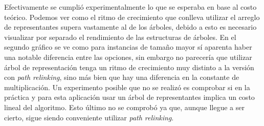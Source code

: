 \indent Efectivamente se cumpli\'o experimentalmente lo que se esperaba en base al costo te\'orico. Podemos ver como el ritmo de crecimiento que conlleva utilizar el arreglo de representantes supera vastamente al de los árboles, debido a esto es necesario visualizar por separado el rendimiento de las estructuras de árboles. En el segundo gr\'afico se ve como para instancias de tama\~no mayor sí aparenta haber una notable diferencia entre las opciones, sin embargo no parecer\'ia que utilizar árbol de representaci\'on tenga un ritmo de crecimiento muy distinto a la versi\'on con \textit{path relinking}, sino más bien que hay una diferencia en la constante de multiplicaci\'on. Un experimento posible que no se realiz\'o es comprobar si en la práctica y para esta aplicaci\'on usar un árbol de representantes implica un costo lineal del algoritmo. Esto último no se comprob\'o ya que, aunque llegue a ser cierto, sigue siendo conveniente utilizar \textit{path relinking}.

